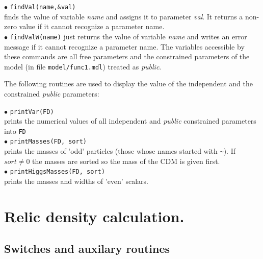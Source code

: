 \documentclass[12pt,a4paper]{article}
\begin{document}
\noindent
$\bullet$ \verb|findVal(name,&val)|\\
 finds the  value of
 variable  {\it name} and assigns it to parameter {\it val}. It returns a non-zero
value  if it cannot recognize  a parameter name. \\

\noindent
$\bullet$ \verb|findValW(name)| 
just returns the value of variable {\it name} and writes an error message
if it cannot recognize  a parameter name.
The variables accessible by these commands are all free parameters and   the 
constrained parameters of the model (in file \verb|model/func1.mdl|)
treated as {\it public}. 

The following routines are used to display the value of the independent and the constrained 
{\it public}
parameters: 


\noindent
$\bullet$ \verb|printVar(FD)|\\ 
prints the numerical values of all independent and {\it public} 
constrained parameters into \verb|FD|\\
$\bullet$ \verb|printMasses(FD, sort)|\\
 prints the masses of 'odd' particles
(those whose names  started with \verb|~|). If $sort\ne 0$
the masses are sorted so the mass of the CDM is given first.\\
$\bullet$ \verb|printHiggsMasses(FD, sort)|\\
prints the masses and widths of 'even' scalars.\\


\section{Relic density calculation.}
\subsection{Switches and auxilary routines}
\end{document}
